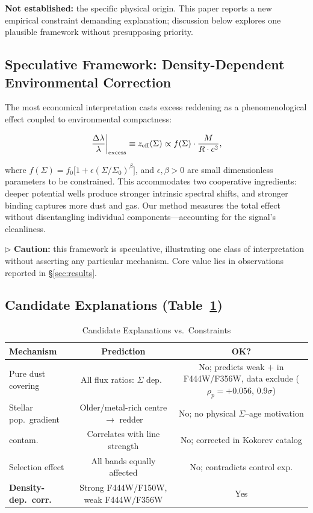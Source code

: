 \documentclass[apjl,twocolumn,longbibliography,linenumbers]{aastex701}
\begin{document}
\textbf{Not established:} the specific physical origin.
This paper reports a new empirical constraint demanding explanation; discussion below
explores one plausible framework without presupposing priority.

\subsection{Speculative Framework: Density-Dependent Environmental Correction}
\label{sec:framework}

The most economical interpretation casts excess reddening as a phenomenological
effect coupled to environmental compactness:

\begin{equation}
\left.\frac{\Delta\lambda}{\lambda}\right|_{\rm excess}
\equiv z_{\rm eff}(\Sigma) \propto f(\Sigma)\cdot\frac{M}{R\cdot c^2},
\end{equation}

where $f(\Sigma) = f_0\bigl[1 + \epsilon(\Sigma/\Sigma_0)^{\beta}\bigr]$,
and $\epsilon,\beta > 0$ are small dimensionless parameters to be constrained.
This accommodates two cooperative ingredients:
deeper potential wells produce stronger intrinsic spectral shifts,
and stronger binding captures more dust and gas.
Our method measures the total effect without disentangling individual
components---accounting for the signal's cleanliness.

\noindent$\triangleright$ \textbf{Caution:} this framework is speculative,
illustrating one class of interpretation without asserting any particular mechanism.
Core value lies in observations reported in \S\ref{sec:results}.

\subsection{Candidate Explanations (Table~\ref{tab:candidates})}

\begin{table}[t!]
\noindent\hspace{-6em}\begin{minipage}{0.95\textwidth}
\caption{Candidate Explanations vs.\ Constraints}
\label{tab:candidates}
\begin{tabular}{lcc}
\hline
Mechanism & Prediction & OK? \\
\hline
Pure dust covering &
All flux ratios: $\Sigma$ dep.\ &
No; predicts weak $+$ in F444W/F356W,
data exclude ($\rho_p=+0.056$, $0.9\sigma$) \\
Stellar pop.\ gradient &
Older/metal-rich centre $\rightarrow$ redder &
No; no physical $\Sigma$--age motivation \\
[O~III] contam.\ &
Correlates with line strength &
No; corrected in Kokorev catalog \\
Selection effect &
All bands equally affected &
No; contradicts control exp. \\
\textbf{Density-dep.\ corr.} &
Strong F444W/F150W, weak F444W/F356W & Yes \\
\hline
\end{tabular}
\end{minipage}
\end{table}
\end{document}
